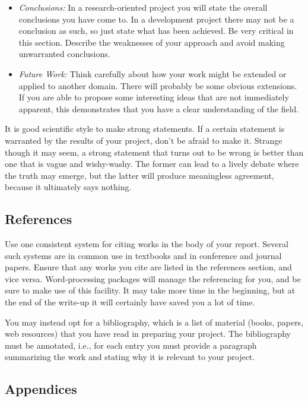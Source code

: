 \documentclass[]{final_report}
\begin{document}
\begin{itemize}
\item {\sl Conclusions:} In a research-oriented project you will state the overall conclusions you have come to. In a development project there may not be a conclusion as such, so just state what has been achieved. Be very critical in this section. Describe the weaknesses of your approach and avoid making unwarranted conclusions.
\item {\sl Future Work:} Think carefully about how your work might be extended or applied to another domain. There will probably be some obvious extensions. If you are able to propose some interesting ideas that are not immediately apparent, this demonstrates that you have a clear understanding of the field.
\end{itemize}

It is good scientific style to make strong statements. If a certain statement is warranted by the results of your project, don't be afraid to make it. Strange though it may seem, a strong statement that turns out to be wrong is better than one that is vague and wishy-washy. The former can lead to a lively debate where the truth may emerge, but the latter will produce meaningless agreement, because it ultimately says nothing.

\subsection{References}

Use one consistent system for citing works in the body of your report. Several such systems are in common use in textbooks and in conference and journal papers. Ensure that any works you cite are listed in the references section, and vice versa. Word-processing packages will manage the referencing for you, and be sure to make use of this facility. It may take more time in the beginning, but at the end of the write-up it will certainly have saved you a lot of time.

You may instead opt for a bibliography, which is a list of material (books, papers, web resources) that you have read in preparing your project. The bibliography must be annotated, i.e., for each entry you must provide a paragraph summarizing the work and stating why it is relevant to your project.

\subsection{Appendices}
\end{document}

